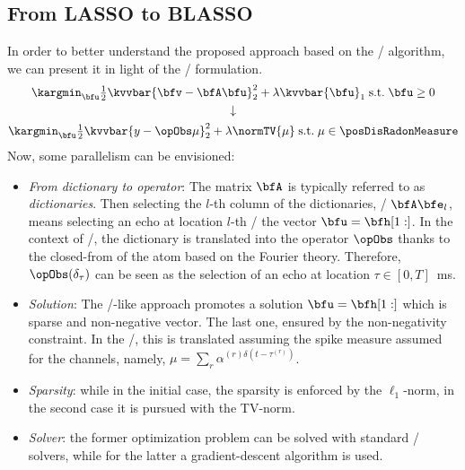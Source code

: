 \subsection{From LASSO to BLASSO}
In order to better understand the proposed approach based on the \BLASSO/ algorithm, we can present it in light of the \LASSO/ formulation.
\begin{gather*}
    \kargmin_\bfu \tfrac{1}{2} \kvvbar{\bfv - \bfA \bfu}_2^2 + \lambda \kvvbar{\bfu}_1 \;\text{s.t.}\; \bfu \geq 0\\
    \downarrow\\
    \kargmin_\bfu \tfrac{1}{2} \kvvbar{y - \opObs\mu}_2^2 + \lambda \normTV{\mu} \;\text{s.t.}\; \mu \in\posDisRadonMeasure\\
\end{gather*}
Now, some parallelism can be envisioned:
\begin{itemize}
    \item\textit{From dictionary to operator}:
    The matrix $\bfA$ is typically referred to as \textit{dictionaries}.
    Then selecting the $l$-th column of the dictionaries, \ie/ $\bfA\bfe_l$, means selecting an echo at location $l$-th \wrt/ the vector $\bfu = \bfh[1:]$.
    In the context of \CD/, the dictionary is translated into the operator $\opObs$ thanks to the closed-from of the atom based on the Fourier theory.
    Therefore, $\opObs(\delta_\tau)$ can be seen as the selection of an echo at location $\tau \in [0, T]$~ms.
    \item\textit{Solution}:
    The \LASSO/-like approach promotes a solution $\bfu = \bfh[1:]$ which is sparse and non-negative vector. The last one, ensured by the non-negativity constraint.
    In the \BLASSO/, this is translated assuming the spike measure assumed for the channels, namely, $\mu = \sum_r \alpha^{(r) \delta(t - \tau^{(r)})}$.
    \item\textit{Sparsity}: while in the initial case, the sparsity is enforced by the $\ell_1$-norm, in the second case it is pursued with the TV-norm.
    \item\textit{Solver}: the former optimization problem can be solved with standard \LASSO/ solvers, while for the latter a gradient-descent algorithm is used.
\end{itemize}

